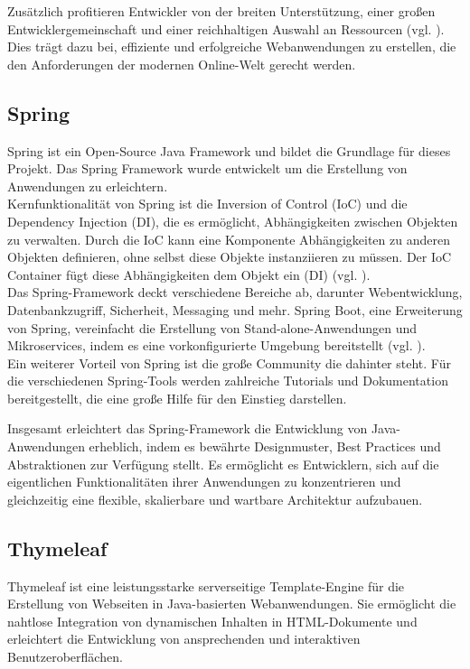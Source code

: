 \documentclass[fontsize=12pt,openright,oneside,paper=a4,BCOR=1cm]{scrbook}
\begin{document}
Zusätzlich profitieren Entwickler von der breiten Unterstützung, einer großen Entwicklergemeinschaft und einer reichhaltigen Auswahl an Ressourcen (vgl. \cite{scalosoftjava}). Dies trägt dazu bei, effiziente und erfolgreiche Webanwendungen zu erstellen, die den Anforderungen der modernen Online-Welt gerecht werden.

\subsection{Spring}

Spring ist ein Open-Source Java Framework und bildet die Grundlage für dieses Projekt. Das Spring Framework wurde entwickelt um die Erstellung von Anwendungen zu erleichtern. \\
Kernfunktionalität von Spring ist die Inversion of Control (IoC) und die Dependency Injection (DI), die es ermöglicht, Abhängigkeiten zwischen Objekten zu verwalten. Durch die IoC kann eine Komponente Abhängigkeiten zu anderen Objekten definieren, ohne selbst diese Objekte instanziieren zu müssen. Der IoC Container fügt diese Abhängigkeiten dem Objekt ein (DI) (vgl. \cite{springioc}). \\
Das Spring-Framework deckt verschiedene Bereiche ab, darunter Webentwicklung, Datenbankzugriff, Sicherheit, Messaging und mehr. Spring Boot, eine Erweiterung von Spring, vereinfacht die Erstellung von Stand-alone-Anwendungen und Mikroservices, indem es eine vorkonfigurierte Umgebung bereitstellt (vgl. \cite{springboot}). \\
Ein weiterer Vorteil von Spring ist die große Community die dahinter steht. Für die verschiedenen Spring-Tools werden zahlreiche Tutorials und Dokumentation bereitgestellt, die eine große Hilfe für den Einstieg darstellen. 

Insgesamt erleichtert das Spring-Framework die Entwicklung von Java-Anwendungen erheblich, indem es bewährte Designmuster, Best Practices und Abstraktionen zur Verfügung stellt. Es ermöglicht es Entwicklern, sich auf die eigentlichen Funktionalitäten ihrer Anwendungen zu konzentrieren und gleichzeitig eine flexible, skalierbare und wartbare Architektur aufzubauen.

\subsection{Thymeleaf}

Thymeleaf ist eine leistungsstarke serverseitige Template-Engine für die Erstellung von Webseiten in Java-basierten Webanwendungen. Sie ermöglicht die nahtlose Integration von dynamischen Inhalten in HTML-Dokumente und erleichtert die Entwicklung von ansprechenden und interaktiven Benutzeroberflächen.
\end{document}
